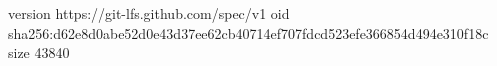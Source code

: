 version https://git-lfs.github.com/spec/v1
oid sha256:d62e8d0abe52d0e43d37ee62cb40714ef707fdcd523efe366854d494e310f18c
size 43840
